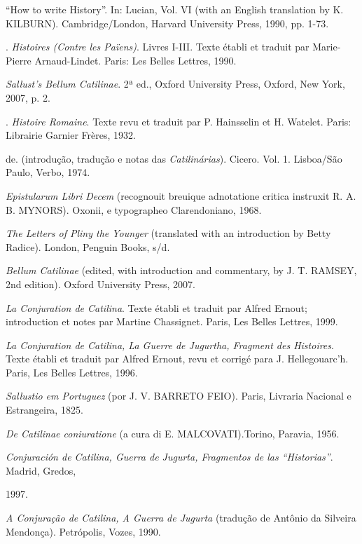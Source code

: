 \begin{bibliohedra}
 “How to write History”. In: Lucian, Vol. VI (with an English translation by K. KILBURN). Cambridge/London, Harvard University Press, 1990, pp. 1-73.

. \emph{Histoires (Contre les Païens)}. Livres I-III. Texte établi et traduit par Marie-Pierre Arnaud-Lindet. Paris: Les Belles Lettres, 1990. 

 \emph{Sallust’s Bellum Catilinae}. 2ª ed., Oxford University Press, Oxford, New York, 2007,   p. 2. 

.  \emph{Histoire Romaine}. Texte revu et traduit par P. Hainsselin et H. Watelet. Paris: Librairie Garnier Frères, 1932.  


 de. (introdução, tradução e notas das \emph{Catilinárias}). Cicero. Vol. 1. Lisboa/São Paulo, Verbo, 1974. 

 \emph{Epistularum Libri Decem} (recognouit breuique adnotatione critica instruxit R. A. B. MYNORS). Oxonii, e typographeo Clarendoniano, 1968. 

 \emph{The Letters of Pliny the Younger} (translated with an introduction by Betty Radice). London, Penguin Books, s/d.


 \emph{Bellum Catilinae} (edited, with introduction and commentary, by J. T. RAMSEY, 2nd edition). Oxford University Press, 2007.

 \emph{La Conjuration de Catilina}. Texte établi et traduit par Alfred Ernout; introduction et notes par Martine Chassignet. Paris, Les Belles Lettres, 1999.

 \emph{La Conjuration de Catilina, La Guerre de Jugurtha, Fragment des Histoires}. Texte établi et traduit par Alfred Ernout, revu et corrigé para J. Hellegouarc’h. Paris, Les Belles Lettres, 1996.

 \emph{Sallustio em Portuguez} (por J. V. BARRETO FEIO). Paris, Livraria Nacional e Estrangeira, 1825.

 \emph{De Catilinae coniuratione} (a cura di E. MALCOVATI).Torino, Paravia, 1956.


 \emph{Conjuración de Catilina, Guerra de Jugurta, Fragmentos de las “Historias”}. Madrid, Gredos,

1997.

 \emph{A Conjuração de Catilina, A Guerra de Jugurta} (tradução de Antônio da Silveira Mendonça). Petrópolis, Vozes, 1990.



\end{bibliohedra}
